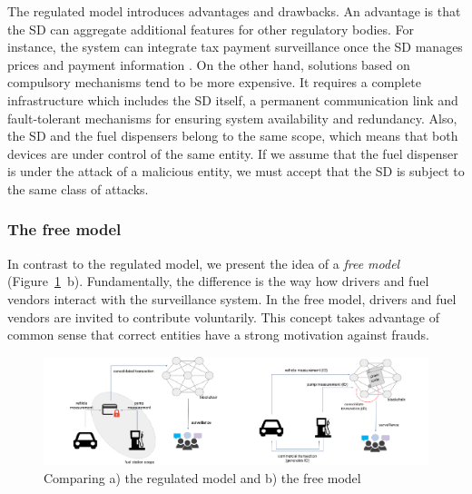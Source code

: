 \documentclass[sigplan]{acmart}
\begin{document}
The regulated model introduces advantages and drawbacks.
An advantage is that the SD can aggregate additional features for other regulatory bodies. 
For instance, the system can integrate tax payment surveillance once the SD manages prices and payment information \cite{Beteto2016}. 
On the other hand, solutions based on compulsory mechanisms tend to be more expensive.
It requires a complete infrastructure which includes the SD itself, a permanent communication link and fault-tolerant mechanisms for ensuring system availability and redundancy.
Also, the SD and the fuel dispensers belong to the same scope, which means that both devices are under control of the same entity.
If we assume that the fuel dispenser is under the attack of a malicious entity, we must accept that the SD is subject to the same class of attacks.

\subsubsection{The free model}
\label{s:freemodel}
In contrast to the regulated model, we present the idea of a \emph{free model} (Figure~\ref{f:reg-free}~b).
Fundamentally, the difference is the way how drivers and fuel vendors interact with the surveillance system.
In the free model, drivers and fuel vendors are invited to contribute voluntarily.
This concept takes advantage of common sense that correct entities have a strong motivation against frauds.

\begin{figure}[!t]
\centering
\includegraphics[width=.95\textwidth]{reg-free}
\caption{Comparing a) the regulated model and b) the free model}
\label{f:reg-free}
\end{figure}
\end{document}
